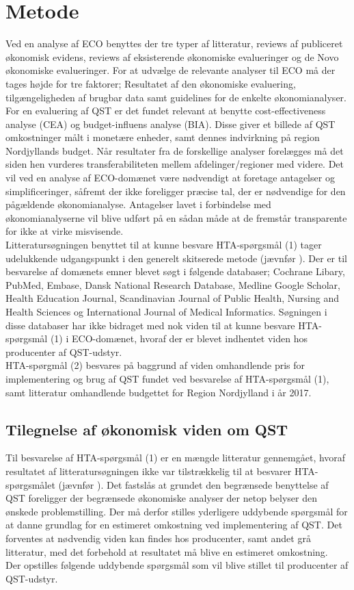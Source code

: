 \section{Metode}
Ved en analyse af ECO benyttes der tre typer af litteratur, reviews af publiceret økonomisk evidens, reviews af eksisterende økonomiske evalueringer og de Novo økonomiske evalueringer. For at udvælge de relevante analyser til ECO må der tages højde for tre faktorer; Resultatet af den økonomiske evaluering, tilgængeligheden af brugbar data samt guidelines for de enkelte økonomianalyser. For en evaluering af QST er det fundet relevant at benytte cost-effectiveness analyse (CEA) og budget-influens analyse (BIA). Disse giver et billede af QST omkostninger målt i monetære enheder, samt dennes indvirkning på region Nordjyllands budget. Når resultater fra de forskellige analyser forelægges må det siden hen vurderes transferabiliteten mellem afdelinger/regioner med videre. Det vil ved en analyse af ECO-domænet være nødvendigt at foretage antagelser og simplificeringer, såfremt der ikke foreligger præcise tal, der er nødvendige for den pågældende økonomianalyse. Antagelser lavet i forbindelse med økonomianalyserne vil blive udført på en sådan måde at de fremstår transparente for ikke at virke misvisende. \\
Litteratursøgningen benyttet til at kunne besvare HTA-spørgsmål (1) tager udelukkende udgangspunkt i den generelt skitserede metode (jævnfør ). Der er til besvarelse af domænets emner blevet søgt i følgende databaser; Cochrane Libary, PubMed, Embase, Dansk National Research Database, Medline Google Scholar, Health Education Journal, Scandinavian Journal of Public Health, Nursing and Health Sciences og International Journal of Medical Informatics. Søgningen i disse databaser har ikke bidraget med nok viden til at kunne besvare HTA-spørgsmål (1) i ECO-domænet, hvoraf der er blevet indhentet viden hos producenter af QST-udstyr. \\
HTA-spørgmål (2) besvares på baggrund af viden omhandlende pris for implementering og brug af QST fundet ved  besvarelse af HTA-spørgsmål (1), samt litteratur omhandlende budgettet for Region Nordjylland i år 2017. 

\subsection{Tilegnelse af økonomisk viden om QST}
Til besvarelse af HTA-spørgsmål (1) er en mængde litteratur gennemgået, hvoraf resultatet af litteratursøgningen ikke var tilstrækkelig til at besvarer HTA-spørgsmålet (jævnfør ). Det fastslås at grundet den begrænsede benyttelse af QST foreligger der begrænsede økonomiske analyser der netop belyser den ønskede problemstilling. Der må derfor stilles yderligere uddybende spørgsmål for at danne grundlag for en estimeret omkostning ved implementering af QST. Det forventes at nødvendig viden kan findes hos producenter, samt andet grå litteratur, med det forbehold at resultatet må blive en estimeret omkostning.\\ 
Der opstilles følgende uddybende spørgsmål som vil blive stillet til producenter af QST-udstyr.

